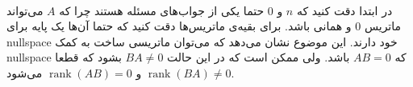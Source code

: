 \\
در ابتدا دقت کنید که
$n$
و 0
حتما یکی از جواب‌های مسئله هستند چرا که
$A$
می‌تواند ماتریس 0 و همانی باشد.
برای بقیه‌ی ماتریس‌ها دقت کنید که حتما آن‌ها یک پایه برای
nullspace
خود دارند. این موضوع نشان می‌دهد که می‌توان ماتریسی ساخت به کمک
nullspace
که
$AB = 0$
باشد. ولی ممکن است که در این حالت
$BA \neq 0$
بشود که قطعا
$\operatorname{rank}(BA) \neq 0$
و
$\operatorname{rank}(AB) = 0$
می‌شود.


